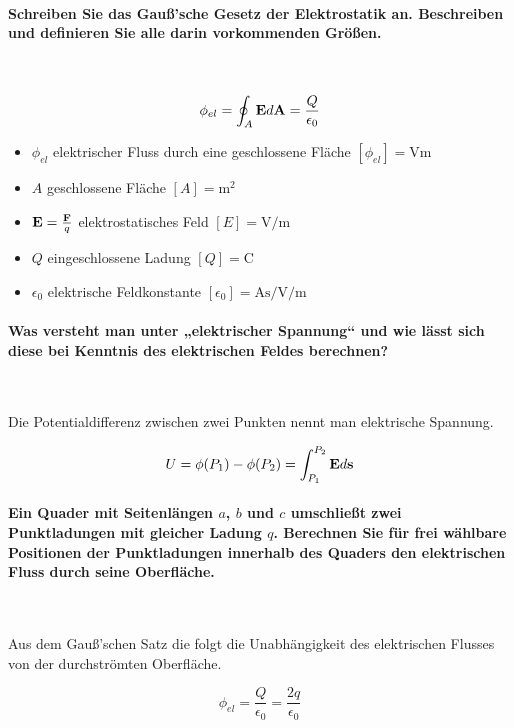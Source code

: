 \documentclass[a4paper, 11pt, ngerman, parskip=half-]{scrartcl}
\begin{document}
\paragraph{Schreiben Sie das Gauß'sche Gesetz der Elektrostatik an. Beschreiben und definieren Sie
    alle darin vorkommenden Größen.} ~

\begin{equation}
    \phi_{el} = \oint_A \bold{E} d\bold{A} = \frac{Q}{\epsilon_0}
\end{equation}

\begin{itemize}
    \item $\phi_{el}$ elektrischer Fluss durch eine geschlossene Fläche $[\phi_{el}] = \si{\V\m}$
    \item $A$ geschlossene Fläche $[A] = \si{\m^2}$
    \item $\bold{E} = \frac{\bold{F}}{q}$ elektrostatisches Feld $[E] = \si{\V\per\m}$
    \item $Q$ eingeschlossene Ladung $[Q] = \si{\coulomb}$
    \item $\epsilon_0$ elektrische Feldkonstante $[\epsilon_0] = \si{\A\s\per\V\per\m}$
\end{itemize}

\paragraph{Was versteht man unter „elektrischer Spannung“ und wie lässt sich diese bei Kenntnis des
    elektrischen Feldes berechnen?} ~

Die Potentialdifferenz zwischen zwei Punkten nennt man elektrische Spannung.

\begin{equation}
    U = \phi(P_1) - \phi(P_2) = \int_{P_1}^{P_2} \bold{E} d\bold{s}
\end{equation}

\paragraph{Ein Quader mit Seitenlängen $a$, $b$ und $c$ umschließt zwei Punktladungen mit gleicher
    Ladung $q$. Berechnen Sie für frei wählbare Positionen der Punktladungen innerhalb des Quaders den
    elektrischen Fluss durch seine Oberfläche.} ~

Aus dem Gauß'schen Satz die folgt die Unabhängigkeit des elektrischen Flusses von der durchströmten
Oberfläche.

\begin{equation}
    \phi_{el} = \frac{Q}{\epsilon_0} = \frac{2 q}{\epsilon_0}
\end{equation}
\end{document}
